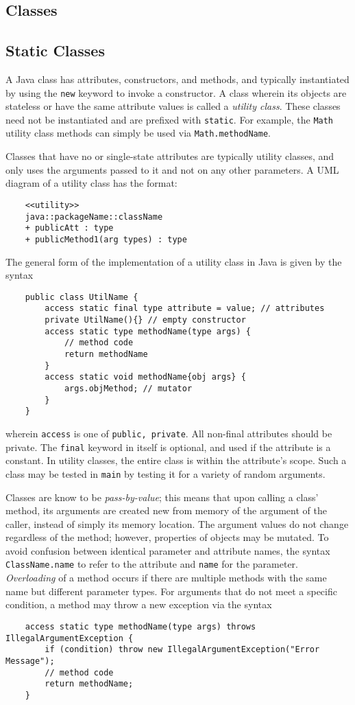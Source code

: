 \documentclass[letterpaper, openany, justified]{tufte-book}
\newcommand{\cd}[1]{\lstinline{#1}}
\begin{document}
\begin{fullwidth}
\chapter{Classes}

\section{Static Classes}
A Java class has attributes, constructors, and methods, and typically instantiated by using the \cd{new} keyword to invoke a constructor. A class wherein its objects are stateless or have the same attribute values is called a \emph{utility class}. These classes need not be instantiated and are prefixed with \cd{static}. For example, the \cd{Math} utility class methods can simply be used via \cd{Math.methodName}.

\bigskip
Classes that have no or single-state attributes are typically utility classes, and only uses the arguments passed to it and not on any other parameters. A UML diagram of a utility class has the format:
\begin{lstlisting}
    <<utility>>
    java::packageName::className
    + publicAtt : type
    + publicMethod1(arg types) : type
\end{lstlisting}
The general form of the implementation of a utility class in Java is given by the syntax
\begin{lstlisting}
    public class UtilName {
        access static final type attribute = value; // attributes
        private UtilName(){} // empty constructor
        access static type methodName(type args) {
            // method code
            return methodName
        }
        access static void methodName{obj args} {
            args.objMethod; // mutator
        }
    }
\end{lstlisting}
wherein \cd{access} is one of \cd{public, private}. All non-final attributes should be private. The \cd{final} keyword in itself is optional, and used if the attribute is a constant. In utility classes, the entire class is within the attribute's scope. Such a class may be tested in \cd{main} by testing it for a variety of random arguments.

\bigskip
Classes are know to be \emph{pass-by-value}; this means that upon calling a class' method, its arguments are created new from memory of the argument of the caller, instead of simply its memory location. The argument values do not change regardless of the method; however, properties of objects may be mutated. To avoid confusion between identical parameter and attribute names, the syntax \cd{ClassName.name} to refer to the attribute and \cd{name} for the parameter. \emph{Overloading} of a method occurs if there are multiple methods with the same name but different parameter types. For arguments that do not meet a specific condition, a method may throw a new exception via the syntax
\begin{lstlisting}
    access static type methodName(type args) throws IllegalArgumentException {
        if (condition) throw new IllegalArgumentException("Error Message");
        // method code
        return methodName;
    }
\end{lstlisting}


\end{fullwidth}
\end{document}
